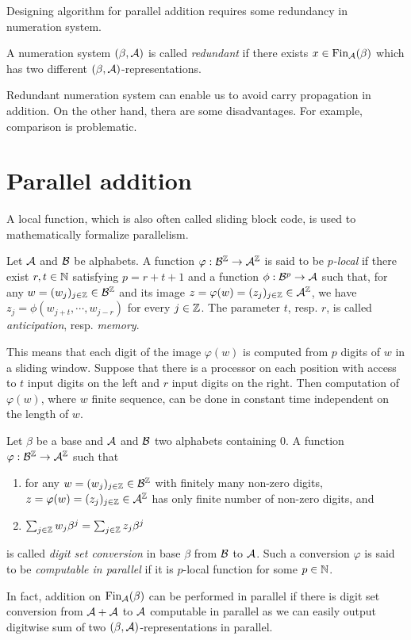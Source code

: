 Designing algorithm for parallel addition requires some redundancy in numeration system. 
\begin{defn}
A numeration system $(\beta,\mathcal{A})$ is called \emph{redundant} if there exists $x \in \text{Fin}_{\mathcal{A}}(\beta)$ which has two different $(\beta,\mathcal{A})$-representations.
\end{defn}
Redundant numeration system can enable us to avoid carry propagation in addition. On the other hand, thera are some disadvantages. For example, comparison is problematic.  


\section{Parallel addition}
A local function, which is also often called sliding block code, is used to mathematically formalize parallelism. 
\begin{defn}
Let $\mathcal{A}$ and $\mathcal{B}$ be alphabets. A function $\varphi:\mathcal{B}^{\mathbb{Z}} \rightarrow \mathcal{A}^{\mathbb{Z}}$ is said to be \emph{$p$-local} if there exist $r,t\in\mathbb{N}$ satisfying $p=r+t+1$ and a function $\phi: \mathcal{B}^p \rightarrow \mathcal{A}$ such that, for any $w=(w_j)_{j\in\mathbb{Z}}\in\mathcal{B}^{\mathbb{Z}}$ and its image $z=\varphi(w)=(z_j)_{j\in\mathbb{Z}}\in\mathcal{A}^{\mathbb{Z}}$, we have $z_j=\phi(w_{j+t},\cdots,w_{j-r})$ for every $j\in\mathbb{Z}$. The parameter $t$, resp. $r$, is called \emph{anticipation}, resp. \emph{memory}.
\end{defn}
This means that each digit of the image $\varphi(w)$ is computed from $p$ digits of $w$ in a sliding window. Suppose that there is a processor on  each position with access to $t$ input digits on the left and $r$ input digits on the right. Then computation of $\varphi(w)$, where $w$ finite sequence, can be done in constant time independent on the length of $w$.   
  
\begin{defn}
\label{def:digitSetConversion}
Let $\beta$ be a base and $\mathcal{A}$ and $\mathcal{B}$ two alphabets containing 0. A function $\varphi:\mathcal{B}^{\mathbb{Z}}\rightarrow \mathcal{A}^{\mathbb{Z}}$ such that
  \begin{enumerate}
      \item for any $w=(w_j)_{j\in\mathbb{Z}}\in\mathcal{B}^{\mathbb{Z}}$ with finitely many non-zero digits, $z=\varphi(w)=(z_j)_{j\in\mathbb{Z}}\in\mathcal{A}^{\mathbb{Z}}$ has only finite number of non-zero digits, and
      \item $\sum_{j\in\mathbb{Z}} w_j \beta^j= \sum_{j\in\mathbb{Z}} z_j \beta^j$
  \end{enumerate}
  is called \emph{digit set conversion} in base $\beta$ from $\mathcal{B}$ to $\mathcal{A}$. Such a conversion $\varphi$ is said to be \emph{computable in parallel} if it is $p$-local function for some $p\in\mathbb{N}$. 
\end{defn}
In fact, addition on $\text{Fin}_{\mathcal{A}}(\beta)$ can be performed in parallel if there is digit set conversion from $\mathcal{A}+\mathcal{A}$ to $\mathcal{A}$ computable in  parallel as we can easily output digitwise sum of two $(\beta,\mathcal{A})$-representations in parallel.   


